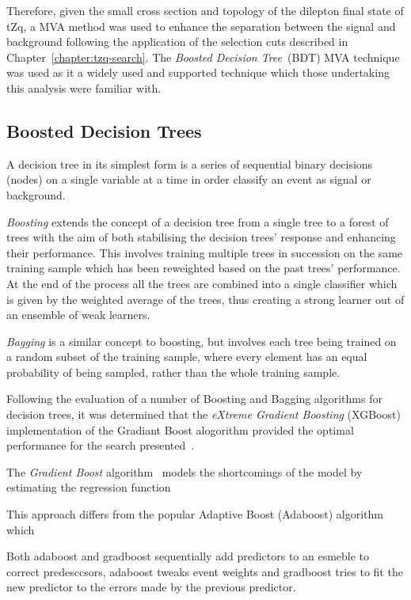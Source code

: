 Therefore, given the small cross section and topology of the dilepton final state of tZq, a MVA method was used to enhance the separation between the signal and background following the application of the selection cuts described in Chapter~\ref{chapter:tzq-search}.
The \emph{Boosted Decision Tree}~(BDT) MVA technique was used as it a widely used and supported technique which those undertaking this analysis were familiar with.

\subsection{Boosted Decision Trees}\label{subsec:bdt}
A decision tree in its simplest form is a series of sequential binary decisions (nodes) on a single variable at a time in order classify an event as signal or background.

\emph{Boosting} extends the concept of a decision tree from a single tree to a forest of trees with the aim of both stabilising the decision trees' response and enhancing their performance.
This involves training multiple trees in succession on the same training sample which has been reweighted based on the past trees' performance.
At the end of the process all the trees are combined into a single classifier which is given by the weighted average of the trees, thus creating a strong learner out of an ensemble of weak learners.

\emph{Bagging} is a similar concept to boosting, but involves each tree being trained on a random subset of the training sample, where every element has an equal probability of being sampled, rather than the whole training sample.

Following the evaluation of a number of Boosting and Bagging algorithms for decision trees, it was determined that the
\emph{eXtreme Gradient Boosting} (XGBoost) implementation of the Gradiant Boost alogorithm provided the optimal performance for the search presented~\cite{xgboost}.

The \emph{Gradient Boost} algorithm~\cite{Friedman:GradientBoosting} models the shortcomings of the model by estimating the regression function 

This approach differs from the popular Adaptive Boost (Adaboost) algorithm which 

Both adaboost and gradboost sequentially add predictors to an esmeble to correct predesccsors, adaboost tweaks event weights and gradboost tries to fit the new predictor to the errors made by the previous predictor.

